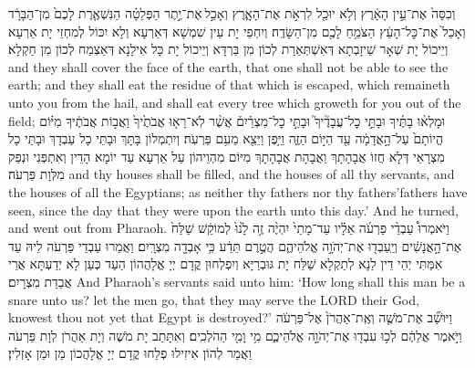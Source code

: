{{וְכִסָּה֙ אֶת־עֵ֣ין הָאָ֔רֶץ וְלֹ֥א יוּכַ֖ל לִרְאֹ֣ת אֶת־הָאָ֑רֶץ וְאָכַ֣ל \legarmeh  אֶת־יֶ֣תֶר הַפְּלֵטָ֗ה הַנִּשְׁאֶ֤רֶת לָכֶם֙ מִן־הַבָּרָ֔ד וְאָכַל֙ אֶת־כׇּל־הָעֵ֔ץ הַצֹּמֵ֥חַ לָכֶ֖ם מִן־הַשָּׂדֶֽה׃
}
{וְיִחְפֵי יָת עֵין שִׁמְשָׁא דְּאַרְעָא וְלָא יִכּוֹל לְמִחְזֵי יָת אַרְעָא וְיֵיכוֹל יָת שְׁאָר שֵׁיזָבְתָא דְּאִשְׁתְּאַרַת לְכוֹן מִן בַּרְדָּא וְיֵיכוֹל יָת כָּל אִילָנָא דְּאַצְמַח לְכוֹן מִן חַקְלָא׃}
{and they shall cover the face of the earth, that one shall not be able to see the earth; and they shall eat the residue of that which is escaped, which remaineth unto you from the hail, and shall eat every tree which groweth for you out of the field;}{}
{וּמָלְא֨וּ בָתֶּ֜יךָ וּבָתֵּ֣י כׇל־עֲבָדֶ֘יךָ֮ וּבָתֵּ֣י כׇל־מִצְרַ֒יִם֒ אֲשֶׁ֨ר לֹֽא־רָא֤וּ אֲבֹתֶ֙יךָ֙ וַאֲב֣וֹת אֲבֹתֶ֔יךָ מִיּ֗וֹם הֱיוֹתָם֙ עַל־הָ֣אֲדָמָ֔ה עַ֖ד הַיּ֣וֹם הַזֶּ֑ה וַיִּ֥פֶן וַיֵּצֵ֖א מֵעִ֥ם פַּרְעֹֽה׃}
{וְיִתְמְלוֹן בָּתָּךְ וּבָתֵּי כָל עַבְדָךְ וּבָתֵּי כָל מִצְרָאֵי דְּלָא חֲזוֹ אֲבָהָתָךְ וַאֲבָהָת אֲבָהָתָךְ מִיּוֹם מִהְוֵיהוֹן עַל אַרְעָא עַד יוֹמָא הָדֵין וְאִתְפְּנִי וּנְפַק מִלְּוָת פַּרְעֹה׃}
{and thy houses shall be filled, and the houses of all thy servants, and the houses of all the Egyptians; as neither thy fathers nor thy fathers’fathers have seen, since the day that they were upon the earth unto this day.’ And he turned, and went out from Pharaoh.}{}
{וַיֹּאמְרוּ֩ עַבְדֵ֨י פַרְעֹ֜ה אֵלָ֗יו עַד־מָתַי֙ יִהְיֶ֨ה זֶ֥ה לָ֙נוּ֙ לְמוֹקֵ֔שׁ שַׁלַּח֙ אֶת־הָ֣אֲנָשִׁ֔ים וְיַֽעַבְד֖וּ אֶת־יְהֹוָ֣ה אֱלֹהֵיהֶ֑ם הֲטֶ֣רֶם תֵּדַ֔ע כִּ֥י אָבְדָ֖ה מִצְרָֽיִם׃
}
{וַאֲמַרוּ עַבְדֵי פַּרְעֹה לֵיהּ עַד אִמַּתִּי יְהֵי דֵין לַנָא לְתַקְלָא שַׁלַּח יָת גּוּבְרַיָּא וְיִפְלְחוּן קֳדָם יְיָ אֱלָהֲהוֹן הַעַד כְּעַן לָא יְדַעְתָּא אֲרֵי אֲבַדַת מִצְרָיִם׃}
{And Pharaoh’s servants said unto him: ‘How long shall this man be a snare unto us? let the men go, that they may serve the LORD their God, knowest thou not yet that Egypt is destroyed?’}{}
{וַיּוּשַׁ֞ב אֶת־מֹשֶׁ֤ה וְאֶֽת־אַהֲרֹן֙ אֶל־פַּרְעֹ֔ה וַיֹּ֣אמֶר אֲלֵהֶ֔ם לְכ֥וּ עִבְד֖וּ אֶת־יְהֹוָ֣ה אֱלֹהֵיכֶ֑ם מִ֥י וָמִ֖י הַהֹלְכִֽים׃
}
{וְאִתָּתַב יָת מֹשֶׁה וְיָת אַהֲרֹן לְוָת פַּרְעֹה וַאֲמַר לְהוֹן אִיזִילוּ פְלַחוּ קֳדָם יְיָ אֱלָהֲכוֹן מַן וּמַן אָזְלִין׃}
}
